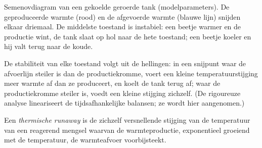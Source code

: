 \begin{omfigure}

{\small Semenovdiagram van een gekoelde geroerde tank (modelparameters). De
geproduceerde warmte (rood) en de afgevoerde warmte (blauwe lijn) snijden elkaar driemaal. De
middelste toestand is instabiel: een beetje warmer en de productie wint, de tank
slaat op hol naar de hete toestand; een beetje koeler en hij valt terug naar de koude.}
\end{omfigure}

De stabiliteit van elke toestand volgt uit de hellingen: in een snijpunt
waar de afvoerlijn steiler is dan de productiekromme, voert een kleine
temperatuurstijging meer warmte af dan ze produceert, en koelt de tank terug af;
waar de productiekromme steiler is, voedt een kleine stijging zichzelf. (De
rigoureuze analyse lineariseert de tijdsafhankelijke balansen; ze wordt hier
aangenomen.)

\begin{definition}\label{def:b2:continuous-reactors:runaway}
Een \emph{thermische runaway} is de zichzelf versnellende
stijging van de temperatuur van een reagerend mengsel waarvan de warmteproductie,
exponentieel groeiend met de temperatuur, de warmteafvoer voorbijsteekt.
\end{definition}

